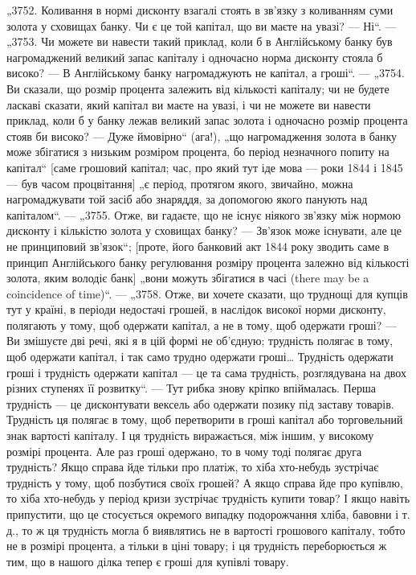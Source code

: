 „3752. Коливання в нормі дисконту взагалі стоять в зв’язку
з коливанням суми золота у сховищах банку. Чи є це той капітал, що ви маєте на увазі? — Ні“. —
„3753. Чи можете ви навести такий приклад, коли б в Англійському банку був нагромаджений великий
запас капіталу і одночасно норма дисконту
стояла б високо? — В Англійському банку нагромаджують не
капітал, а гроші“. — „3754. Ви сказали, що розмір процента залежить від кількості капіталу; чи не
будете ласкаві сказати,
який капітал ви маєте на увазі, і чи не можете ви навести приклад, коли б у банку лежав великий
запас золота і одночасно
розмір процента стояв би високо? — Дуже ймовірно“ (ага!),
„що нагромадження золота в банку може збігатися з низьким розміром процента, бо період незначного
попиту на капітал“
[саме грошовий капітал; час, про який тут іде мова — роки 1844
і 1845 — був часом процвітання] „є період, протягом якого, звичайно,
можна нагромаджувати той засіб або знаряддя, за допомогою якого панують над капіталом“. —
„3755. Отже, ви гадаєте,
що не існує ніякого зв’язку між нормою дисконту і кількістю
золота у сховищах банку? — Зв’язок може існувати, але це не
принциповий зв’язок“; [проте, його банковий акт 1844 року
зводить саме в принцип Англійського банку регулювання розміру процента залежно від кількості золота,
яким володіє банк]
„вони можуть збігатися в часі (there may be a coincidence
of time)“. — „3758. Отже, ви хочете сказати, що труднощі для купців тут у країні, в періоди
недостачі грошей, в наслідок високої
норми дисконту, полягають у тому, щоб одержати капітал, а не
в тому, щоб одержати гроші? — Ви змішуєте дві речі, які я в
цій формі не об’єдную; трудність полягає в тому, щоб одержати капітал, і так само трудно одержати
гроші\dots{} Трудність одержати гроші і трудність одержати капітал — це
та сама трудність, розглядувана на двох різних ступенях
її розвитку“. — Тут рибка знову кріпко впіймалась. Перша
трудність — це дисконтувати вексель або одержати позику під
заставу товарів. Трудність ця полягає в тому, щоб перетворити
в гроші капітал або торговельний знак вартості капіталу. І ця
трудність виражається, між іншим, у високому розмірі процента.
Але раз гроші одержано, то в чому тоді полягає друга трудність? Якщо справа йде тільки про платіж,
то хіба хто-небудь
зустрічає трудність у тому, щоб позбутися своїх грошей? А якщо справа йде про купівлю, то хіба
хто-небудь у період кризи
зустрічає трудність купити товар? І якщо навіть припустити,
що це стосується окремого випадку подорожчання хліба, бавовни і т. д., то ж ця трудність могла б
виявлятись не
в вартості грошового капіталу, тобто не в розмірі процента, а
тільки в ціні товару; і ця трудність переборюється ж тим,
що в нашого ділка тепер є гроші для купівлі товару.

